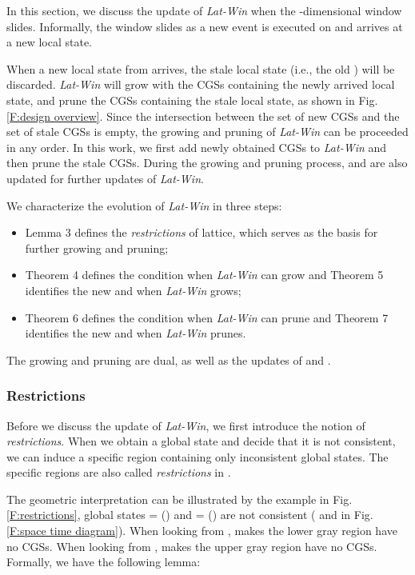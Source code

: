 \documentclass[12pt,journal,letterpaper,compsoc]{IEEEtran}
\begin{document}
In this section, we discuss the update of {\it Lat-Win} when the -dimensional window slides. Informally, the window slides as a new event is executed on  and  arrives at a new local state.

When a new local state from  arrives, the stale local state (i.e., the old ) will be discarded. {\it Lat-Win} will grow with the CGSs containing the newly arrived local state, and prune the CGSs containing the stale local state, as shown in Fig. \ref{F:design overview}. Since the intersection between the set of new CGSs and the set of stale CGSs is empty, the growing and pruning of {\it Lat-Win} can be proceeded in any order. In this work, we first add newly obtained CGSs to {\it Lat-Win} and then prune the stale CGSs. During the growing and pruning process,  and  are also updated for further updates of {\it Lat-Win}.

We characterize the evolution of {\it Lat-Win} in three steps:
\begin{itemize}
    \item Lemma 3 defines the {\it restrictions} of lattice, which serves as the basis for further growing and pruning;
    \item Theorem 4 defines the condition when {\it Lat-Win} can grow and Theorem 5 identifies the new  and  when {\it Lat-Win} grows;
    \item Theorem 6 defines the condition when {\it Lat-Win} can prune and Theorem 7 identifies the new  and  when {\it Lat-Win} prunes.
\end{itemize}

\noindent The growing and pruning are dual, as well as the updates of  and .

\subsubsection{Restrictions}

Before we discuss the update of {\it Lat-Win}, we first introduce the notion of {\it restrictions}. When we obtain a global state and decide that it is not consistent, we can induce a specific region containing only inconsistent global states. The specific regions are also called {\it restrictions} in \cite{Mattern89}.

The geometric interpretation can be illustrated by the example in Fig. \ref{F:restrictions}, global states  = () and  = () are not consistent ( and  in Fig. \ref{F:space time diagram}). When looking from ,  makes the lower gray region have no CGSs. When looking from ,  makes the upper gray region have no CGSs. Formally, we have the following lemma: \\
\end{document}
